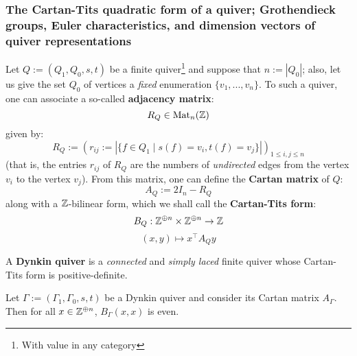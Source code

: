         \subsubsection{The Cartan-Tits quadratic form of a quiver; Grothendieck groups, Euler characteristics, and dimension vectors of quiver representations}
            \begin{definition} \label{def: cartan_tits_quadratic_forms_of_finite_quivers}
                Let $Q := (Q_1, Q_0, s, t)$ be a finite quiver\footnote{With value in any category} and suppose that $n := |Q_0|$; also, let us give the set $Q_0$ of vertices a \textit{fixed} enumeration $\{v_1, ..., v_n\}$. To such a quiver, one can associate a so-called \textbf{adjacency matrix}:
                    $$R_Q \in \mathrm{Mat}_n(\mathbb{Z})$$
                given by:
                    $$R_Q := (r_{ij} := |\{f \in Q_1 \mid s(f) = v_i, t(f) = v_j\}|)_{1 \leq i, j \leq n}$$
                (that is, the entries $r_{ij}$ of $R_Q$ are the numbers of \textit{undirected} edges from the vertex $v_i$ to the vertex $v_j$). From this matrix, one can define the \textbf{Cartan matrix} of $Q$:
                    $$A_Q := 2I_n - R_Q$$
                along with a $\mathbb{Z}$-bilinear form, which we shall call the \textbf{Cartan-Tits form}:
                    $$B_Q: \Z^{\oplus n} \x \Z^{\oplus n} \to \Z$$
                    $$(x, y) \mapsto x^{\top} A_Q y$$                
            \end{definition}
            \begin{definition} \label{def: dynkin_quivers}
                A \textbf{Dynkin quiver} is a \textit{connected} and \textit{simply laced} finite quiver whose Cartan-Tits form is positive-definite.
            \end{definition}
            \begin{proposition}
                Let $\Gamma := (\Gamma_1, \Gamma_0, s, t)$ be a Dynkin quiver and consider its Cartan matrix $A_{\Gamma}$. Then for all $x \in \mathbb{Z}^{\oplus n}$, $B_{\Gamma}(x, x)$ is even.  
            \end{proposition}
